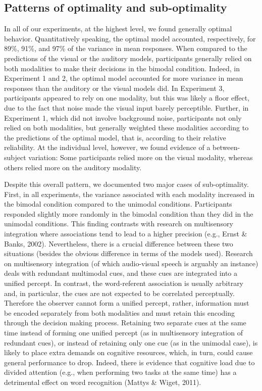 \documentclass[english,,man,floatsintext]{apa6}
\theoremstyle{definition}
\theoremstyle{definition}
\theoremstyle{definition}
\theoremstyle{remark}
\begin{document}
\subsection{Patterns of optimality and
sub-optimality}\label{patterns-of-optimality-and-sub-optimality}

In all of our experiments, at the highest level, we found generally
optimal behavior. Quantitatively speaking, the optimal model accounted,
respectively, for 89\%, 91\%, and 97\% of the variance in mean
responses. When compared to the predictions of the visual or the
auditory models, participants generally relied on both modalities to
make their decisions in the bimodal condition. Indeed, in Experiment 1
and 2, the optimal model accounted for more variance in mean responses
than the auditory or the visual models did. In Experiment 3,
participants appeared to rely on one modality, but this was likely a
floor effect, due to the fact that noise made the visual input barely
perceptible. Further, in Experiment 1, which did not involve background
noise, participants not only relied on both modalities, but generally
weighted these modalities according to the predictions of the optimal
model, that is, according to their relative reliability. At the
individual level, however, we found evidence of a between-subject
variation: Some participants relied more on the visual modality, whereas
others relied more on the auditory modality.

Despite this overall pattern, we documented two major cases of
sub-optimality. First, in all experiments, the variance associated with
each modality increased in the bimodal condition compared to the
unimodal conditions. Participants responded slightly more randomly in
the bimodal condition than they did in the unimodal conditions. This
finding contrasts with research on multisensory integration where
associations tend to lead to a higher precision (e.g., Ernst \& Banks,
2002). Nevertheless, there is a crucial difference between these two
situations (besides the obvious difference in terms of the models used).
Research on multisensory integration (of which audio-visual speech is
arguably an instance) deals with redundant multimodal cues, and these
cues are integrated into a unified percept. In contrast, the
word-referent association is usually arbitrary and, in particular, the
cues are not expected to be correlated perceptually. Therefore the
observer cannot form a unified percept, rather, information must be
encoded separately from both modalities and must retain this encoding
through the decision making process. Retaining two separate cues at the
same time instead of forming one unified percept (as in multisensory
integration of redundant cues), or instead of retaining only one cue (as
in the unimodal case), is likely to place extra demands on cognitive
resources, which, in turn, could cause general performance to drop.
Indeed, there is evidence that cognitive load due to divided attention
(e.g., when performing two tasks at the same time) has a detrimental
effect on word recognition (Mattys \& Wiget, 2011).
\end{document}
